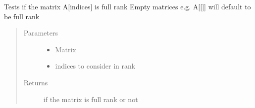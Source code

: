 \documentclass[letterpaper,10pt,english]{sphinxmanual}
\begin{document}
\begin{fulllineitems}
\label{\detokenize{mpo.utils:mpo.utils.constraint_utilities.is_full_rank}}
\sphinxAtStartPar
Tests if the matrix A{[}indices{]} is full rank
Empty matrices e.g. A{[}{[}{]}{]} will default to be full rank
\begin{quote}\begin{description}
\item[{Parameters}] \leavevmode\begin{itemize}
\item {} 
\sphinxAtStartPar
{} \textendash{} Matrix

\item {} 
\sphinxAtStartPar
{} \textendash{} indices to consider in rank

\end{itemize}

\item[{Returns}] \leavevmode
\sphinxAtStartPar
if the matrix is full rank or not

\end{description}\end{quote}

\end{fulllineitems}

\end{document}
